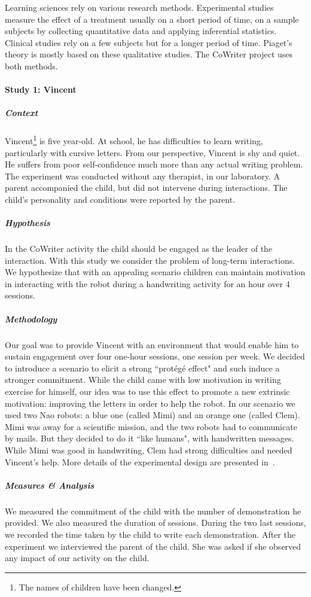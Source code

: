 \documentclass[10pt,a4paper]{article}
\begin{document}
Learning sciences rely on various research methods. Experimental studies measure the effect of a treatment usually on a short period of time, on a sample subjects by collecting quantitative data and applying inferential statistics. Clinical studies rely on a few subjects but for a longer period of time. Piaget's theory is mostly based on these qualitative studies. The CoWriter project uses both methods.

\paragraph{Study 1: Vincent}
\subparagraph{Context}
Vincent\footnote{The names of children have been changed.} is five year-old. At school, he has difficulties to learn writing, particularly with cursive letters. From our perspective, Vincent is shy and quiet. He suffers from poor self-confidence much more than any actual writing problem. The experiment was conducted without any therapist, in our laboratory. A parent accompanied the child, but did not intervene during interactions. The child's personality and conditions were reported by the parent.
\subparagraph{Hypothesis}
In the CoWriter activity the child should be engaged as the leader of the interaction. 
With this study we consider the problem of long-term interactions. We hypothesize that with an appealing scenario children can maintain motivation in interacting with the robot during a handwriting activity for an hour over 4 sessions.
\subparagraph{Methodology}
Our goal was to provide Vincent with
an environment that would enable him to sustain engagement over four one-hour sessions, 
one session per week. We decided to introduce a scenario to elicit a strong ``prot\'eg\'e effect" and such induce a stronger commitment. While the child came with low motivation in writing exercise for himself, our idea was to use this effect to promote a new extrinsic motivation: improving the letters in order to help the robot. 
In our scenario we used two Nao robots: a blue one 
(called Mimi) and an orange one (called Clem). Mimi was away for a 
scientific mission, and the two robots had to communicate by mails. But they decided to do it 
``like humans", with handwritten messages. While Mimi was good in handwriting, 
Clem had strong difficulties and needed Vincent's help. More details of the experimental design are presented in~\cite{jacq2016building}.
\subparagraph{Measures \& Analysis}
We measured the commitment of the child with the number of demonstration he provided. We also measured the duration of sessions. During the two last sessions, we recorded the time taken by the child to write each demonstration. After the experiment we interviewed the parent of the child. She was asked if she observed any impact of our activity on the child.
\end{document}
